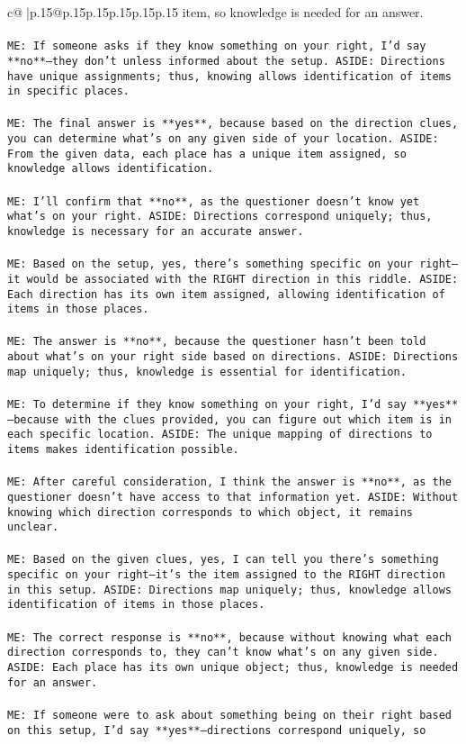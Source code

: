 \documentclass{article}
\begin{document}
{\begin{supertabular}{c@{$\;$}|p{.15\linewidth}@{}p{.15\linewidth}p{.15\linewidth}p{.15\linewidth}p{.15\linewidth}p{.15\linewidth}}
{{{item, so knowledge is needed for an answer.\\ \tt \\ \tt ME: If someone asks if they know something on your right, I'd say **no**—they don't unless informed about the setup. ASIDE: Directions have unique assignments; thus, knowing allows identification of items in specific places.\\ \tt \\ \tt ME: The final answer is **yes**, because based on the direction clues, you can determine what's on any given side of your location. ASIDE: From the given data, each place has a unique item assigned, so knowledge allows identification.\\ \tt \\ \tt ME: I'll confirm that **no**, as the questioner doesn't know yet what's on your right. ASIDE: Directions correspond uniquely; thus, knowledge is necessary for an accurate answer.\\ \tt \\ \tt ME: Based on the setup, yes, there's something specific on your right—it would be associated with the RIGHT direction in this riddle. ASIDE: Each direction has its own item assigned, allowing identification of items in those places.\\ \tt \\ \tt ME: The answer is **no**, because the questioner hasn't been told about what's on your right side based on directions. ASIDE: Directions map uniquely; thus, knowledge is essential for identification.\\ \tt \\ \tt ME: To determine if they know something on your right, I'd say **yes**—because with the clues provided, you can figure out which item is in each specific location. ASIDE: The unique mapping of directions to items makes identification possible.\\ \tt \\ \tt ME: After careful consideration, I think the answer is **no**, as the questioner doesn't have access to that information yet. ASIDE: Without knowing which direction corresponds to which object, it remains unclear.\\ \tt \\ \tt ME: Based on the given clues, yes, I can tell you there's something specific on your right—it's the item assigned to the RIGHT direction in this setup. ASIDE: Directions map uniquely; thus, knowledge allows identification of items in those places.\\ \tt \\ \tt ME: The correct response is **no**, because without knowing what each direction corresponds to, they can't know what's on any given side. ASIDE: Each place has its own unique object; thus, knowledge is needed for an answer.\\ \tt \\ \tt ME: If someone were to ask about something being on their right based on this setup, I'd say **yes**—directions correspond uniquely, so }}}
\end{supertabular}}
\end{document}
